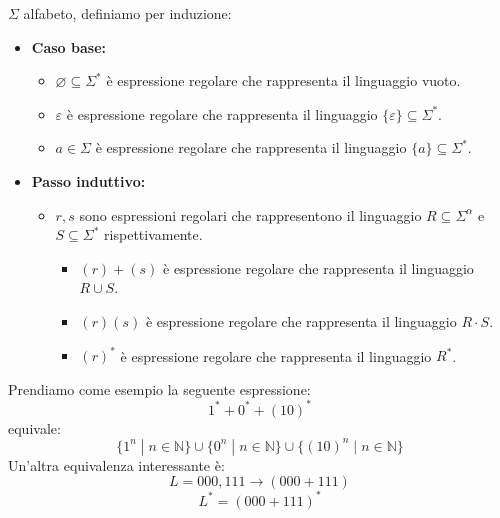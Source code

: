 \documentclass[a4paper]{article}
\begin{document}
\dfn{}
{
  $\Sigma$ alfabeto, definiamo per induzione:
  \begin{itemize}
    \item \textbf{Caso base:}
  \begin{itemize}
    \item $\varnothing \subseteq \Sigma^*$ è espressione regolare che rappresenta il linguaggio vuoto.
    \item $\varepsilon$ è espressione regolare che rappresenta il linguaggio $\{\varepsilon\} \subseteq \Sigma^*$.
    \item $a \in \Sigma$ è espressione regolare che rappresenta il linguaggio $\{a\} \subseteq \Sigma^*$. 
  \end{itemize}
  \item \textbf{Passo induttivo:}
  \begin{itemize}
    \item $r, s$ sono espressioni regolari che rappresentono il linguaggio $R \subseteq \Sigma^\alpha$ e $S \subseteq \Sigma^*$ rispettivamente.
    \begin{itemize}
      \item $(r)+(s)$ è espressione regolare che rappresenta il linguaggio $R \cup S$.
      \item $(r)(s)$ è espressione regolare che rappresenta il linguaggio $R \cdot S$.
      \item $(r)^*$ è espressione regolare che rappresenta il linguaggio $R^*$.
    \end{itemize}
  \end{itemize}
\end{itemize}
}
\ex{}
{
  Prendiamo come esempio la seguente espressione:
  \[1^* + 0^* + (10)^*\]
  equivale:
  \[\{1^n \; | \; n \in \mathbb{N}\} \cup \{0^n \; | \; n \in \mathbb{N}\} \cup \{(10)^n \; | \; n \in \mathbb{N}\}\]
  Un'altra equivalenza interessante è:
  \[L = {000,111} \rightarrow (000 + 111)\]
  \[L^* = (000 + 111)^*\]
}
\end{document}
